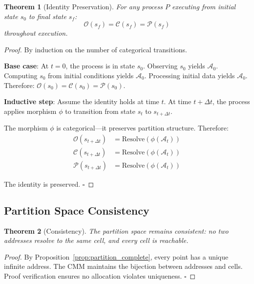 \documentclass[twocolumn,10pt]{article}
\newtheorem{theorem}{Theorem}[section]
\theoremstyle{definition}
\theoremstyle{remark}
\newcommand{\cataddr}{\mathcal{A}}
\begin{document}
\begin{theorem}[Identity Preservation]
For any process $P$ executing from initial state $s_0$ to final state $s_f$:
\begin{equation}
    \mathcal{O}(s_f) = \mathcal{C}(s_f) = \mathcal{P}(s_f)
\end{equation}
throughout execution.
\end{theorem}

\begin{proof}
By induction on the number of categorical transitions.

\textbf{Base case}: At $t=0$, the process is in state $s_0$. Observing $s_0$ yields $\cataddr_0$. Computing $s_0$ from initial conditions yields $\cataddr_0$. Processing initial data yields $\cataddr_0$. Therefore: $\mathcal{O}(s_0) = \mathcal{C}(s_0) = \mathcal{P}(s_0)$.

\textbf{Inductive step}: Assume the identity holds at time $t$. At time $t + \Delta t$, the process applies morphism $\phi$ to transition from state $s_t$ to $s_{t+\Delta t}$.

The morphism $\phi$ is categorical—it preserves partition structure. Therefore:
\begin{align}
    \mathcal{O}(s_{t+\Delta t}) &= \text{Resolve}(\phi(\cataddr_t)) \\
    \mathcal{C}(s_{t+\Delta t}) &= \text{Resolve}(\phi(\cataddr_t)) \\
    \mathcal{P}(s_{t+\Delta t}) &= \text{Resolve}(\phi(\cataddr_t))
\end{align}

The identity is preserved. $\square$
\end{proof}

\subsection{Partition Space Consistency}

\begin{theorem}[Consistency]
The partition space remains consistent: no two addresses resolve to the same cell, and every cell is reachable.
\end{theorem}

\begin{proof}
By Proposition~\ref{prop:partition_complete}, every point has a unique infinite address. The CMM maintains the bijection between addresses and cells. Proof verification ensures no allocation violates uniqueness. $\square$
\end{proof}
\end{document}
